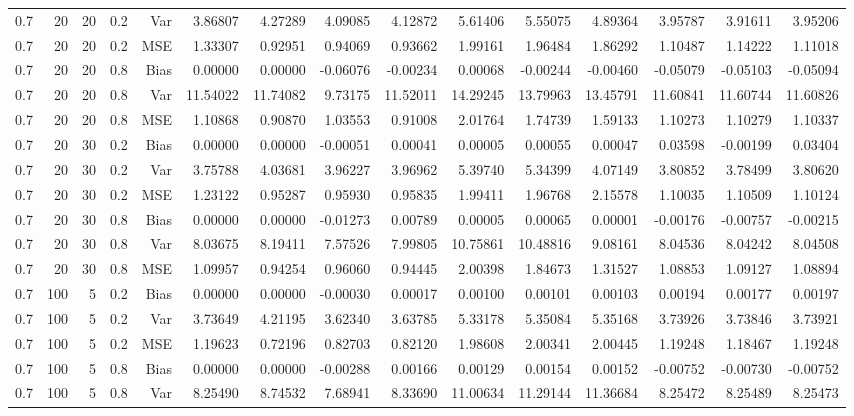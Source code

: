 \begin{table}[!htbp]
\begin{tabular}{lrrrrrrrrrrrrrr}
0.7 &  20 & 20 & 0.2 & Var & 3.86807 & 4.27289 & 4.09085 & 4.12872 & 5.61406 & 5.55075 & 4.89364 & 3.95787 & 3.91611 & 3.95206 \\
0.7 &  20 & 20 & 0.2 & MSE & 1.33307 & 0.92951 & 0.94069 & 0.93662 & 1.99161 & 1.96484 & 1.86292 & 1.10487 & 1.14222 & 1.11018 \\
0.7 &  20 & 20 & 0.8 & Bias & 0.00000 & 0.00000 & -0.06076 & -0.00234 & 0.00068 & -0.00244 & -0.00460 & -0.05079 & -0.05103 & -0.05094 \\
0.7 &  20 & 20 & 0.8 & Var & 11.54022 & 11.74082 & 9.73175 & 11.52011 & 14.29245 & 13.79963 & 13.45791 & 11.60841 & 11.60744 & 11.60826 \\
0.7 &  20 & 20 & 0.8 & MSE & 1.10868 & 0.90870 & 1.03553 & 0.91008 & 2.01764 & 1.74739 & 1.59133 & 1.10273 & 1.10279 & 1.10337 \\
0.7 &  20 & 30 & 0.2 & Bias & 0.00000 & 0.00000 & -0.00051 & 0.00041 & 0.00005 & 0.00055 & 0.00047 & 0.03598 & -0.00199 & 0.03404 \\
0.7 &  20 & 30 & 0.2 & Var & 3.75788 & 4.03681 & 3.96227 & 3.96962 & 5.39740 & 5.34399 & 4.07149 & 3.80852 & 3.78499 & 3.80620 \\
0.7 &  20 & 30 & 0.2 & MSE & 1.23122 & 0.95287 & 0.95930 & 0.95835 & 1.99411 & 1.96768 & 2.15578 & 1.10035 & 1.10509 & 1.10124 \\
0.7 &  20 & 30 & 0.8 & Bias & 0.00000 & 0.00000 & -0.01273 & 0.00789 & 0.00005 & 0.00065 & 0.00001 & -0.00176 & -0.00757 & -0.00215 \\
0.7 &  20 & 30 & 0.8 & Var & 8.03675 & 8.19411 & 7.57526 & 7.99805 & 10.75861 & 10.48816 & 9.08161 & 8.04536 & 8.04242 & 8.04508 \\
0.7 &  20 & 30 & 0.8 & MSE & 1.09957 & 0.94254 & 0.96060 & 0.94445 & 2.00398 & 1.84673 & 1.31527 & 1.08853 & 1.09127 & 1.08894 \\
0.7 & 100 &  5 & 0.2 & Bias & 0.00000 & 0.00000 & -0.00030 & 0.00017 & 0.00100 & 0.00101 & 0.00103 & 0.00194 & 0.00177 & 0.00197 \\
0.7 & 100 &  5 & 0.2 & Var & 3.73649 & 4.21195 & 3.62340 & 3.63785 & 5.33178 & 5.35084 & 5.35168 & 3.73926 & 3.73846 & 3.73921 \\
0.7 & 100 &  5 & 0.2 & MSE & 1.19623 & 0.72196 & 0.82703 & 0.82120 & 1.98608 & 2.00341 & 2.00445 & 1.19248 & 1.18467 & 1.19248 \\
0.7 & 100 &  5 & 0.8 & Bias & 0.00000 & 0.00000 & -0.00288 & 0.00166 & 0.00129 & 0.00154 & 0.00152 & -0.00752 & -0.00730 & -0.00752 \\
0.7 & 100 &  5 & 0.8 & Var & 8.25490 & 8.74532 & 7.68941 & 8.33690 & 11.00634 & 11.29144 & 11.36684 & 8.25472 & 8.25489 & 8.25473 \\

\end{tabular}
\end{table}
